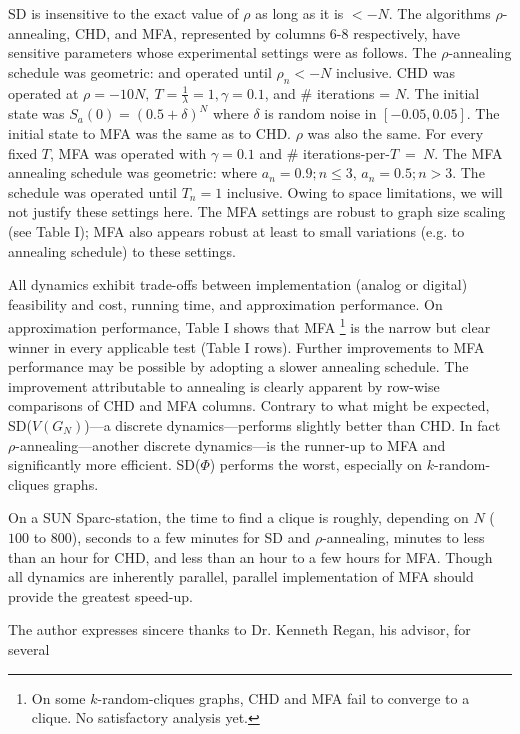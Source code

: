 SD is insensitive to the exact value of $\rho$ as long as it is 
$< -N$.
The algorithms $\rho$-annealing, CHD, and MFA, represented by columns
6-8 respectively, have sensitive parameters whose experimental settings were
as follows.
The $\rho$-annealing schedule was geometric:
and operated until $\rho_{n} < -N$ inclusive.
CHD was operated at $\rho = -10 N,~T = \frac{1}{\lambda} = 1, \gamma = 0.1$, and
\# iterations = $N$. The initial state was $S_a(0) = (0.5 + \delta)^N$
where $\delta$ is random noise in $[-0.05,0.05]$.
The initial state to MFA was the same as to CHD. $\rho$ was also the
same.
For every fixed $T$, MFA
was operated with $\gamma=0.1$ and \# iterations-per-$T~=~N$.
The MFA annealing schedule was geometric:
where  $a_n = 0.9; n \leq 3$, $a_n = 0.5; n > 3$. The
schedule was operated until $T_n=1$ inclusive. Owing to space limitations,
we will not justify these settings here. The MFA settings are robust
to graph size scaling (see Table I); MFA also appears robust at
least to
small variations (e.g. to annealing schedule) to these settings. \par
All dynamics exhibit trade-offs between implementation (analog or digital)
feasibility and cost, running time, and approximation
performance. On approximation performance,
Table I shows that MFA 
\footnote{On some $k$-random-cliques graphs, CHD and MFA fail to 
converge to a clique. No satisfactory analysis yet.}
is the narrow but clear winner in every applicable
test (Table I rows). Further improvements to MFA performance 
may be possible by adopting a slower annealing schedule.
The improvement attributable to annealing is clearly apparent by row-wise
comparisons of CHD and MFA columns. Contrary to what might be
expected, SD($V(G_N)$)---a discrete dynamics---performs slightly better than CHD.
In fact $\rho$-annealing---another discrete dynamics---is the runner-up
to MFA and significantly more efficient. SD($\Phi$) performs the worst,
especially on $k$-random-cliques graphs.
\par
On a SUN Sparc-station, the time to find a clique is roughly,
depending on $N$ ($100$ to $800$),
seconds to a few minutes 
for SD and $\rho$-annealing,
minutes to less than an hour for CHD, and
less than an hour to a few hours for MFA.
Though all dynamics are inherently parallel, parallel implementation
of MFA should provide the greatest speed-up. \par
The author expresses sincere thanks to Dr. Kenneth Regan, his advisor, for several
